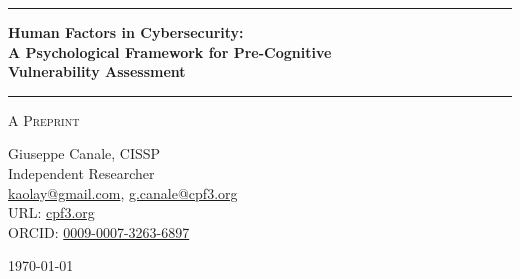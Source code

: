 \documentclass[11pt,a4paper]{article}
\begin{document}
\thispagestyle{empty}
\begin{center}

\vspace*{0.5cm}

\rule{\textwidth}{1.5pt}

\vspace{0.5cm}

{\LARGE \textbf{Human Factors in Cybersecurity:}}\\[0.3cm]
{\LARGE \textbf{A Psychological Framework for Pre-Cognitive}}\\[0.3cm]
{\LARGE \textbf{Vulnerability Assessment}}

\vspace{0.5cm}

\rule{\textwidth}{1.5pt}

\vspace{0.3cm}

{\large \textsc{A Preprint}}

\vspace{0.5cm}

{\Large Giuseppe Canale, CISSP}\\[0.2cm]
Independent Researcher\\[0.1cm]
\href{mailto:kaolay@gmail.com}{kaolay@gmail.com}, 
\href{mailto:g.canale@escom.it}{g.canale@cpf3.org}\\[0.1cm]
URL: \href{https://cpf3.org}{cpf3.org}\\[0.1cm]
ORCID: \href{https://orcid.org/0009-0007-3263-6897}{0009-0007-3263-6897}

\vspace{0.8cm}

{\large \today}

\vspace{1cm}

\end{center}
\end{document}
